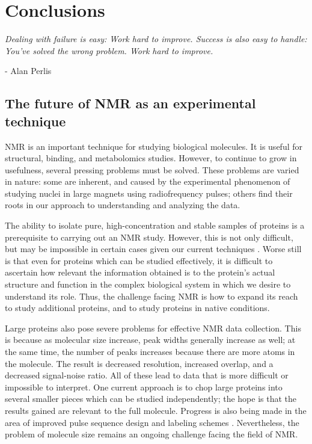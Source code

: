 \chapter{Conclusions}

\begin{center}
  \textit{Dealing with failure is easy: Work hard to improve. Success is also 
    easy to handle: You've solved the wrong problem. Work hard to improve.}

 - Alan Perlis
\end{center}


\section{The future of NMR as an experimental technique}
NMR is an important technique for studying biological molecules.
It is useful for structural, binding, and metabolomics studies.
However, to continue to grow in usefulness, several pressing problems must be solved.
These problems are varied in nature: some are inherent, and caused by the 
experimental phenomenon of studying nuclei in large magnets using 
radiofrequency pulses; others find their roots in our approach to 
understanding and analyzing the data.

The ability to isolate pure, high-concentration and stable samples of proteins 
is a prerequisite to carrying out an NMR study.  However, this is not only
difficult, but may be impossible in certain cases given our current techniques
\cite{bellstedt2013resonance}.  Worse still is that even for proteins which
can be studied effectively, it is difficult to ascertain how relevant the 
information obtained is to the protein's actual structure and function in the
complex biological system in which we desire to understand its role.  Thus, 
the challenge facing NMR is how to expand its reach to study additional proteins,
and to study proteins in native conditions.

Large proteins also pose severe problems for effective NMR data collection.  
This is because as molecular size increase, peak widths generally increase as
well; at the same time, the number of peaks increases because there are more
atoms in the molecule.  The result is decreased resolution, increased overlap,
and a decreased signal-noise ratio.  All of these lead to data that is more
difficult or impossible to interpret.  One current approach is to chop large
proteins into several smaller pieces which can be studied independently; the
hope is that the results gained are relevant to the full molecule.  
Progress is also being made in the area of improved pulse sequence design
and labeling schemes \cite{tzeng2012nmr}.  Nevertheless, the problem of molecule
size remains an ongoing challenge facing the field of NMR.

